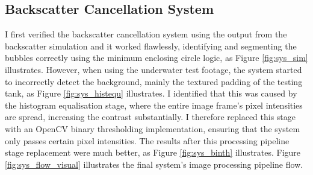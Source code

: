 \subsection{Backscatter Cancellation System}
I first verified the backscatter cancellation system using the output from the backscatter simulation and it worked flawlessly, identifying and segmenting the bubbles correctly using the minimum enclosing circle logic, as Figure \ref{fig:sys_sim} illustrates. However, when using the underwater test footage, the system started to incorrectly detect the background, mainly the textured padding of the testing tank, as Figure \ref{fig:sys_histequ} illustrates. I identified that this was caused by the histogram equalisation stage, where the entire image frame's pixel intensities are spread, increasing the contrast substantially. I therefore replaced this stage with an OpenCV binary thresholding implementation, ensuring that the system only passes certain pixel intensities. The results after this processing pipeline stage replacement were much better, as Figure \ref{fig:sys_binth} illustrates. Figure \ref{fig:sys_flow_visual} illustrates the final system's image processing pipeline flow.

